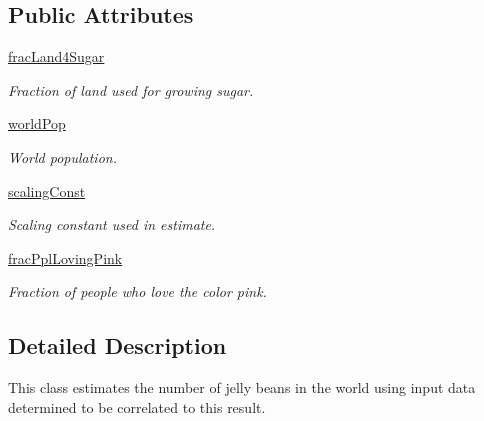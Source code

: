 \subsection*{Public Attributes}
\begin{DoxyCompactItemize}
\item 
\mbox{\label{class_est_num_jellies_1_1_num_jelly_estimator_a9718c54b9d7b610eb5789852daff3661}} 
\hyperlink{class_est_num_jellies_1_1_num_jelly_estimator_a9718c54b9d7b610eb5789852daff3661}{frac\+Land4\+Sugar}
\begin{DoxyCompactList}\small\item\em Fraction of land used for growing sugar. \end{DoxyCompactList}\item 
\mbox{\label{class_est_num_jellies_1_1_num_jelly_estimator_afcc81dee96f41bbac3b8a798bcc9a525}} 
\hyperlink{class_est_num_jellies_1_1_num_jelly_estimator_afcc81dee96f41bbac3b8a798bcc9a525}{world\+Pop}
\begin{DoxyCompactList}\small\item\em World population. \end{DoxyCompactList}\item 
\mbox{\label{class_est_num_jellies_1_1_num_jelly_estimator_a4eef3f82cd4820f723b878333c21f9ce}} 
\hyperlink{class_est_num_jellies_1_1_num_jelly_estimator_a4eef3f82cd4820f723b878333c21f9ce}{scaling\+Const}
\begin{DoxyCompactList}\small\item\em Scaling constant used in estimate. \end{DoxyCompactList}\item 
\hyperlink{class_est_num_jellies_1_1_num_jelly_estimator_adf6fe4e805106a7316b3202cc5c3470e}{frac\+Ppl\+Loving\+Pink}
\begin{DoxyCompactList}\small\item\em Fraction of people who love the color pink. \end{DoxyCompactList}\end{DoxyCompactItemize}


\subsection{Detailed Description}
This class estimates the number of jelly beans in the world using input data determined to be correlated to this result. 

